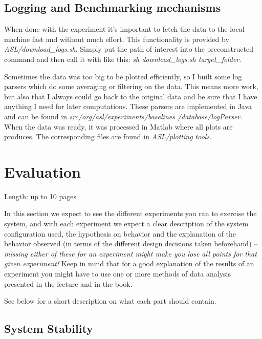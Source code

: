\documentclass[11pt]{article}
\begin{document}
\subsection{Logging and Benchmarking mechanisms}\label{sec:logging-and-benchmarking-mechanisms}
When done with the experiment it's important to fetch the data to the local machine fast and without much effort. This functionality is provided by \textit{ASL/download\_logs.sh}. Simply put the path of interest into the preconstructed command and then call it with like this: \textit{sh download\_logs.sh target\_folder}.

Sometimes the data was too big to be plotted efficiently, so I built some log parsers which do some averaging or filtering on the data. This means more work, but also that I always could go back to the original data and be sure that I have anything I need for later computations. These parsers are implemented in Java and can be found in \textit{src/org/asl/experiments/baselines /database/logParser}. When the data was ready, it was processed in Matlab where all plots are produces. The corresponding files are found in \textit{ASL/plotting tools}.

\section{Evaluation}\label{sec:evaluation}

Length: up to 10 pages

In this section we expect to see the different experiments you ran to
exercise the system, and with each experiment we expect a clear
description of the system configuration used, the hypothesis on behavior
and the explanation of the behavior observed (in terms of the different
design decisions taken beforehand) -- \emph{missing either of these for
an experiment might make you lose all points for that given experiment!}
Keep in mind that for a good explanation of the results of an experiment
you might have to use one or more methods of data analysis presented in
the lecture and in the book.

See below for a short description on what each part should contain.

\subsection{System Stability}\label{sec:system-stability}
\end{document}
